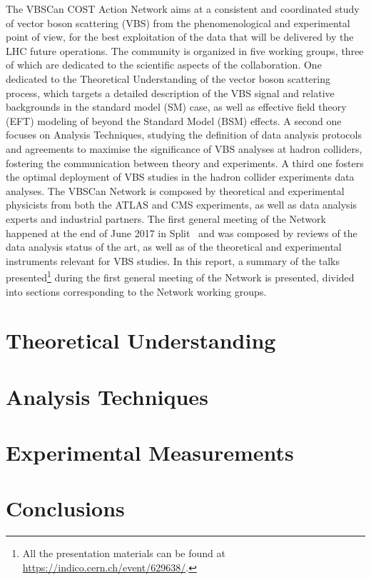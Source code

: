 \documentclass{article}
\begin{document}
The VBSCan COST Action Network aims at a consistent and coordinated study of vector boson scattering (VBS)
from the phenomenological and experimental point of view, 
for the best exploitation of the data that will be delivered by the LHC future operations.
The community is organized in five working groups,
three of which are dedicated to the scientific aspects of the collaboration.
One dedicated to the Theoretical Understanding of the vector boson scattering process,
which targets a detailed description of the VBS signal 
and relative backgrounds in the standard model (SM) case, 
as well as effective field theory (EFT) modeling of beyond the Standard Model (BSM) effects.
A second one focuses on Analysis Techniques,
studying the definition of data analysis protocols and agreements 
to maximise the significance of VBS analyses at hadron colliders, 
fostering the communication between theory and experiments.
A third one fosters the optimal deployment of VBS studies 
in the hadron collider experiments data analyses.
\newline{}
The VBSCan Network is composed by theoretical and experimental physicists from both the ATLAS and CMS experiments,
as well as data analysis experts and industrial partners.
The first general meeting of the Network happened at the end of June 2017 in Split~\cite{kickoff}
and was composed by reviews of the data analysis status of the art,
as well as of the theoretical and experimental instruments
relevant for VBS studies.
In this report,
a summary of the talks presented\footnote{All the presentation materials can be found at \url{https://indico.cern.ch/event/629638/}.} during the first general meeting of the Network is presented,
divided into sections corresponding to the Network working groups.

\section{Theoretical Understanding}



\section{Analysis Techniques}



\section{Experimental Measurements}



\section*{Conclusions}

 \printbibliography

% 
%  
\end{document}
